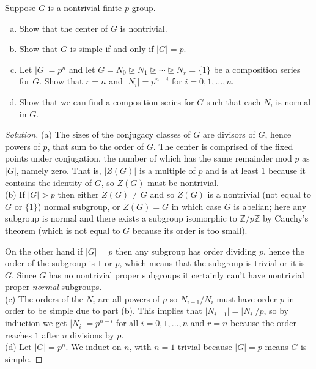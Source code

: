 \documentclass[10pt]{article}
\providecommand{\ZZ}{\mathbb Z}
\providecommand{\ii}{\item}
\newenvironment{soln}{\begin{proof}[Solution]}{\end{proof}}
\providecommand{\abs}[1]{\left|#1\right|}
\begin{document}
\begin{problem}
    Suppose $G$ is a nontrivial finite $p$-group.
    \begin{enumerate}[(a)]
        \ii Show that the center of $G$ is nontrivial.
	\ii Show that $G$ is simple if and only if $\abs G = p$.
	\ii Let $\abs G = p^n$ and let
	$G = N_0\trianglerighteq N_1\trianglerighteq\cdots\trianglerighteq N_r
	= \{1\}$ be a composition series for $G$.
	Show that $r = n$ and $\abs{N_i} = p^{n-i}$ for $i=0,1,\dots,n$.
	\ii Show that we can find a composition series for $G$
	such that each $N_i$ is normal in $G$.
    \end{enumerate}
\end{problem}

\begin{soln}
    (a) The sizes of the conjugacy classes of $G$
    are divisors of $G$, hence powers of $p$, that sum to the order of $G$.
    The center is comprised of the fixed points under conjugation,
    the number of which has the same remainder mod $p$ as $\abs G$,
    namely zero. That is, $\abs{Z(G)}$ is a multiple of $p$
    and is at least $1$ because it contains the identity of $G$,
    so $Z(G)$ must be nontrivial.
    \\

    (b) If $\abs G > p$ then either $Z(G)\ne G$ and so $Z(G)$ is a nontrivial
    (not equal to $G$ or $\{1\}$) normal subgroup,
    or $Z(G) = G$ in which case $G$ is abelian; here any subgroup is normal
    and there exists a subgroup isomorphic to $\ZZ/p\ZZ$ by Cauchy's theorem
    (which is not equal to $G$ because its order is too small).

    On the other hand if $\abs G = p$ then any subgroup has order dividing
    $p$, hence the order of the subgroup is $1$ or $p$,
    which means that the subgroup is trivial or it is $G$.
    Since $G$ has no nontrivial proper subgroups it certainly can't have
    nontrivial proper \emph{normal} subgroups.
    \\

    (c) The orders of the $N_i$ are all powers of $p$
    so $N_{i-1}/N_i$ must have order $p$ in order to be simple
    due to part (b). This implies that $\abs{N_{i-1}} = \abs{N_i}/p$,
    so by induction we get $\abs{N_i} = p^{n-i}$ for all $i=0,1,\dots,n$
    and $r=n$ because the order reaches $1$ after $n$ divisions by $p$.
    \\

    (d) Let $\abs G = p^n$.
    We induct on $n$, with $n=1$ trivial because $\abs G = p$
    means $G$ is simple.


\end{soln}
\end{document}
